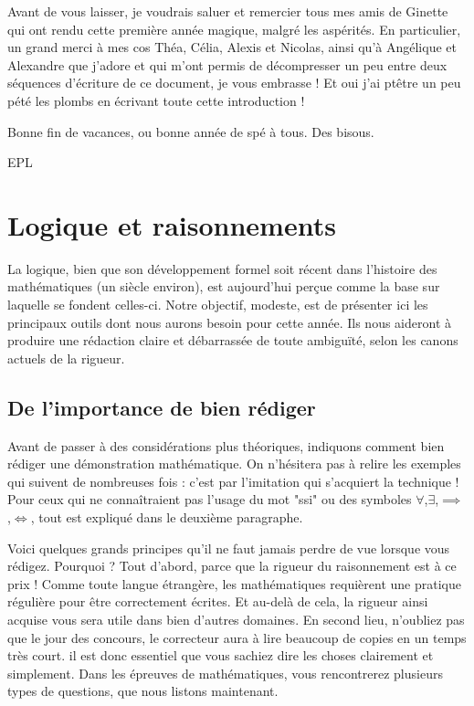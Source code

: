 \documentclass[french]{book}
\theoremstyle{plain}
\theoremstyle{definition}
\theoremstyle{remark}
\begin{document}
\par Avant de vous laisser, je voudrais saluer et remercier tous mes amis de Ginette qui ont rendu cette première année magique, malgré les aspérités. En particulier, un grand merci à mes cos Théa, Célia, Alexis et Nicolas, ainsi qu'à Angélique et Alexandre que j'adore et qui m'ont permis de décompresser un peu entre deux séquences d'écriture de ce document, je vous embrasse ! Et oui j'ai ptêtre un peu pété les plombs en écrivant toute cette introduction ! \\
\par Bonne fin de vacances, ou bonne année de spé à tous. Des bisous.
\begin{flushright}
	EPL
\end{flushright}
\tableofcontents

\mainmatter
\chapter{Logique et raisonnements}
La logique, bien que son développement formel soit récent dans l'histoire des mathématiques (un siècle environ), est aujourd'hui perçue comme la base sur laquelle se fondent celles-ci. Notre objectif, modeste, est de présenter ici les principaux outils dont nous aurons besoin pour cette année. Ils nous aideront à produire une rédaction claire et débarrassée de toute ambiguïté, selon les canons actuels de la rigueur.
\section{De l'importance de bien rédiger}
Avant de passer à des considérations plus théoriques, indiquons comment bien rédiger une démonstration mathématique. On n'hésitera pas à relire les exemples qui suivent de nombreuses fois : c'est par l'imitation qui s'acquiert la technique ! Pour ceux qui ne connaîtraient pas l'usage du mot "ssi" ou des symboles $\forall$,$\exists$,$\implies$,$\iff$, tout est expliqué dans le deuxième paragraphe. \\ \par Voici quelques grands principes qu'il ne faut jamais perdre de vue lorsque vous rédigez. Pourquoi ? Tout d'abord, parce que la rigueur du raisonnement est à ce prix ! Comme toute langue étrangère, les mathématiques requièrent une pratique régulière pour être correctement écrites. Et au-delà de cela, la rigueur ainsi acquise vous sera utile dans bien d'autres domaines. En second lieu, n'oubliez pas que le jour des concours, le correcteur aura à lire beaucoup de copies en un temps très court. il est donc essentiel que vous sachiez dire les choses clairement et simplement. Dans les épreuves de mathématiques, vous rencontrerez plusieurs types de questions, que nous listons maintenant.
\end{document}

